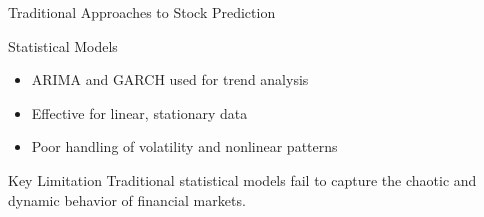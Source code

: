 \begin{frame}[label=traditionalmodels]{Traditional Approaches to Stock Prediction}

    \begin{block}{Statistical Models}
        \begin{itemize}
            \item ARIMA and GARCH used for trend analysis
            \item Effective for linear, stationary data
            \item \alert{Poor handling of volatility and nonlinear patterns}
        \end{itemize}
    \end{block}

    \begin{exampleblock}{Key Limitation}
        Traditional statistical models fail to capture the chaotic and dynamic behavior of financial markets.
    \end{exampleblock}


\end{frame}

